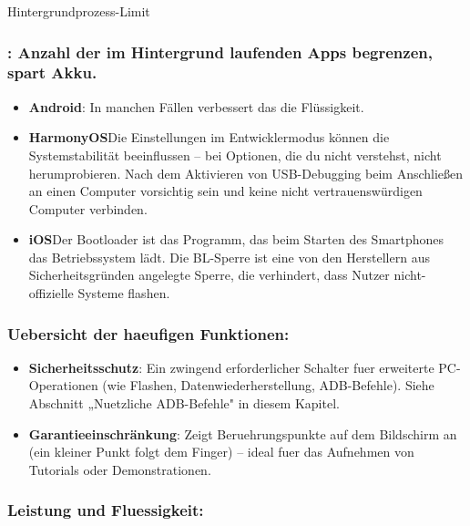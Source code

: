 


Hintergrundprozess-Limit

\subsubsection*{: Anzahl der im Hintergrund laufenden Apps begrenzen, spart Akku.}

\begin{itemize}
  \item \textbf{Android}: In manchen Fällen verbessert das die Flüssigkeit.
  \item \textbf{HarmonyOS}Die Einstellungen im Entwicklermodus können die Systemstabilität beeinflussen – bei Optionen, die du nicht verstehst, nicht herumprobieren. Nach dem Aktivieren von USB-Debugging beim Anschließen an einen Computer vorsichtig sein und keine nicht vertrauenswürdigen Computer verbinden.
  \item \textbf{iOS}Der Bootloader ist das Programm, das beim Starten des Smartphones das Betriebssystem lädt. Die BL-Sperre ist eine von den Herstellern aus Sicherheitsgründen angelegte Sperre, die verhindert, dass Nutzer nicht-offizielle Systeme flashen.
\end{itemize}

\subsubsection*{Uebersicht der haeufigen Funktionen:}

\begin{itemize}
  \item \textbf{Sicherheitsschutz}: Ein zwingend erforderlicher Schalter fuer erweiterte PC-Operationen (wie Flashen, Datenwiederherstellung, ADB-Befehle). Siehe Abschnitt „Nuetzliche ADB-Befehle" in diesem Kapitel.
  \item \textbf{Garantieeinschränkung}: Zeigt Beruehrungspunkte auf dem Bildschirm an (ein kleiner Punkt folgt dem Finger) – ideal fuer das Aufnehmen von Tutorials oder Demonstrationen.
\end{itemize}

\subsubsection*{Leistung und Fluessigkeit:}

